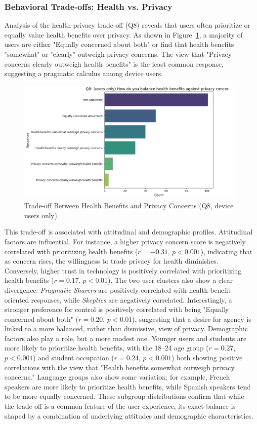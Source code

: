 	\subsubsection{Behavioral Trade-offs: Health vs. Privacy}
	Analysis of the health-privacy trade-off (Q8) reveals that users often prioritize or equally value health benefits over privacy. As shown in Figure~\ref{fig:Q8_tradeoff}, a majority of users are either "Equally concerned about both" or find that health benefits "somewhat" or "clearly" outweigh privacy concerns. The view that "Privacy concerns clearly outweigh health benefits" is the least common response, suggesting a pragmatic calculus among device users.
	\begin{figure}[ht]\centering
		\includegraphics[width=1\linewidth]{figures/questions/Q8_single_choice.png}
		\caption{Trade-off Between Health Benefits and Privacy Concerns (Q8, device users only)}
		\label{fig:Q8_tradeoff}
	\end{figure}
	This trade-off is associated with attitudinal and demographic profiles. Attitudinal factors are influential. For instance, a higher privacy concern score is negatively correlated with prioritizing health benefits ($r = -0.31$, $p < 0.001$), indicating that as concern rises, the willingness to trade privacy for health diminishes. Conversely, higher trust in technology is positively correlated with prioritizing health benefits ($r = 0.17$, $p < 0.01$). The two user clusters also show a clear divergence: \textit{Pragmatic Sharers} are positively correlated with health-benefit-oriented responses, while \textit{Skeptics} are negatively correlated. Interestingly, a stronger preference for control is positively correlated with being "Equally concerned about both" ($r = 0.20$, $p < 0.01$), suggesting that a desire for agency is linked to a more balanced, rather than dismissive, view of privacy.
	Demographic factors also play a role, but a more modest one. Younger users and students are more likely to prioritize health benefits, with the 18--24 age group ($r = 0.27$, $p < 0.001$) and student occupation ($r = 0.24$, $p < 0.001$) both showing positive correlations with the view that "Health benefits somewhat outweigh privacy concerns." Language groups also show some variation; for example, French speakers are more likely to prioritize health benefits, while Spanish speakers tend to be more equally concerned. These subgroup distributions confirm that while the trade-off is a common feature of the user experience, its exact balance is shaped by a combination of underlying attitudes and demographic characteristics.

